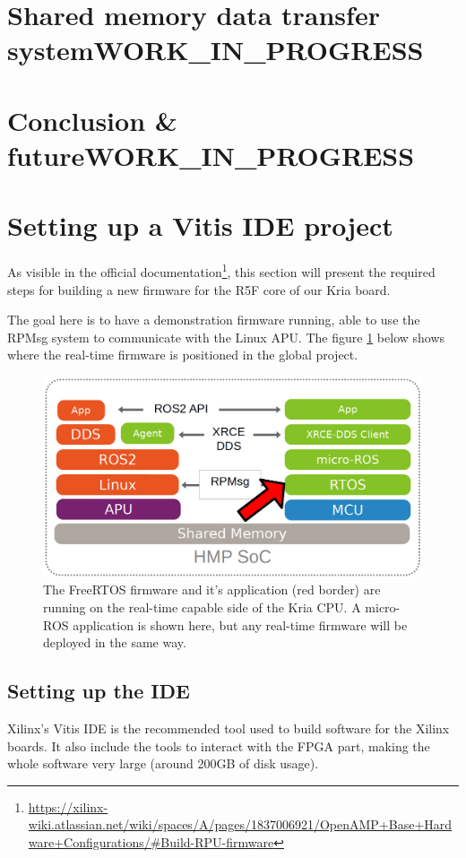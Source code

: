 \documentclass[10pt]{article}
\begin{document}
\clearpage
\section{Shared memory data transfer system\hfill{}\textsc{WORK\_IN\_PROGRESS}}
\label{sec:org04550df}


\clearpage
\section{Conclusion \& future\hfill{}\textsc{WORK\_IN\_PROGRESS}}
\label{sec:org160cf6d}


\clearpage
\appendix

\section{Setting up a Vitis IDE project}
\label{sec:org808ba55}
As visible in the official documentation\footnote{\url{https://xilinx-wiki.atlassian.net/wiki/spaces/A/pages/1837006921/OpenAMP+Base+Hardware+Configurations/\#Build-RPU-firmware}}, this section will present the required
steps for building a new firmware for the R5F core of our Kria board.

The goal here is to have a demonstration firmware running,
able to use the RPMsg system to communicate with the Linux APU.
The figure \ref{fig:org9bdfc87} below shows where the real-time firmware
is positioned in the global project.

\begin{figure}[htbp]
\centering
\includegraphics[width=.6\textwidth]{./img/map_microros.png}
\caption{\label{fig:org9bdfc87}The FreeRTOS firmware and it's application (red border) are running on the real-time capable side of the Kria CPU. A micro-ROS application is shown here, but any real-time firmware will be deployed in the same way.}
\end{figure}

\subsection{Setting up the IDE}
\label{sec:orge54a86e}
Xilinx's Vitis IDE is the recommended tool used to build software for the Xilinx boards.
It also include the tools to interact with the FPGA part, making the whole
software very large (around 200GB of disk usage).
\end{document}
